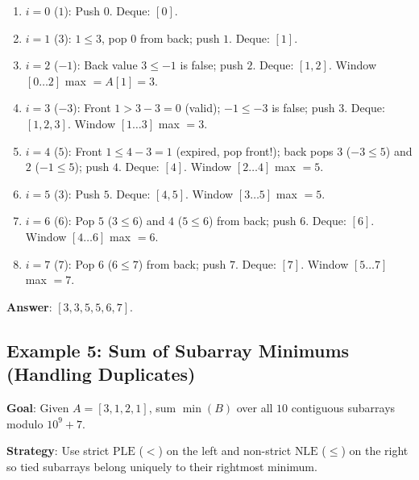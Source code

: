 \documentclass[11pt,a4paper]{article}
\theoremstyle{definition}
\begin{document}
\begin{enumerate}
    \item $i = 0$ ($1$): Push $0$. Deque: $[0]$.
    \item $i = 1$ ($3$): $1 \le 3$, pop $0$ from back; push $1$. Deque: $[1]$.
    \item $i = 2$ ($-1$): Back value $3 \le -1$ is false; push $2$. Deque: $[1, 2]$. Window $[0 \dots 2]$ max $= A[1] = 3$.
    \item $i = 3$ ($-3$): Front $1 > 3 - 3 = 0$ (valid); $-1 \le -3$ is false; push $3$. Deque: $[1, 2, 3]$. Window $[1 \dots 3]$ max $= 3$.
    \item $i = 4$ ($5$): Front $1 \le 4 - 3 = 1$ (expired, pop front!); back pops $3$ ($-3 \le 5$) and $2$ ($-1 \le 5$); push $4$. Deque: $[4]$. Window $[2 \dots 4]$ max $= 5$.
    \item $i = 5$ ($3$): Push $5$. Deque: $[4, 5]$. Window $[3 \dots 5]$ max $= 5$.
    \item $i = 6$ ($6$): Pop $5$ ($3 \le 6$) and $4$ ($5 \le 6$) from back; push $6$. Deque: $[6]$. Window $[4 \dots 6]$ max $= 6$.
    \item $i = 7$ ($7$): Pop $6$ ($6 \le 7$) from back; push $7$. Deque: $[7]$. Window $[5 \dots 7]$ max $= 7$.
\end{enumerate}

\textbf{Answer}: $[3, 3, 5, 5, 6, 7]$.

\subsection{Example 5: Sum of Subarray Minimums (Handling Duplicates)}
\label{ex:subarray_mins}

\textbf{Goal}: Given $A = [3, 1, 2, 1]$, sum $\min(B)$ over all $10$ contiguous subarrays modulo $10^9 + 7$.

\textbf{Strategy}: Use strict $\text{PLE}$ ($<$) on the left and non-strict $\text{NLE}$ ($\le$) on the right so tied subarrays belong uniquely to their rightmost minimum.
\end{document}
